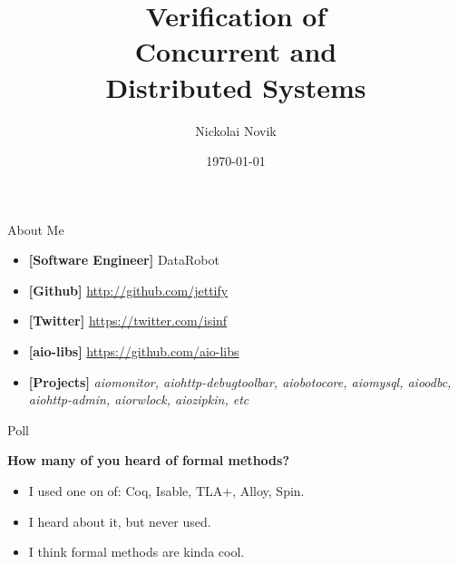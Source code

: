 \documentclass[12pt]{beamer}
\title{Verification of \\ Concurrent and \\ Distributed Systems}
\date{\today}
\author{Nickolai Novik}
\institute{\href{http://github.com/jettify}{http://github.com/jettify}}
\begin{document}
  \maketitle
  \begin{frame}{About Me}
    \begin{itemize}
        \item \textbf{[Software Engineer]}  DataRobot
        \item \textbf{[Github]}
            \href{http://github.com/jettify}{http://github.com/jettify}
        \item \textbf{[Twitter]}
            \href{https://twitter.com/isinf}{https://twitter.com/isinf}
        \item \textbf{[aio-libs]}
            \href{https://github.com/aio-libs}{https://github.com/aio-libs}
        \item \textbf{[Projects]}
            \textit{aiomonitor, aiohttp-debugtoolbar,
          aiobotocore, aiomysql, aioodbc, aiohttp-admin, aiorwlock,
          aiozipkin, etc}
    \end{itemize}
  \end{frame}
  \begin{frame}{Poll}
      \begin{large}
          \textbf{How many of you heard of formal methods?}
      \end{large}
      \begin{itemize}
          \item I used one on of: Coq, Isable, TLA+, Alloy, Spin.
          \item I heard about it, but never used.
          \item I think formal methods are kinda cool.
      \end{itemize}
  \end{frame}
\end{document}
